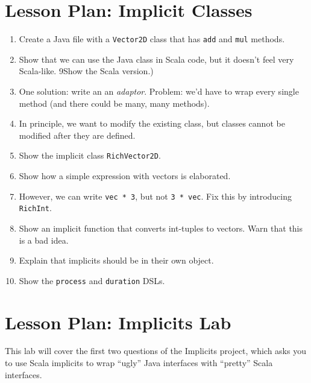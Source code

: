 \documentclass[9pt]{extbook}
\begin{document}
\chapter{Lesson Plan: Implicit Classes}

\begin{enumerate}

\item Create a Java file with  a \lstinline|Vector2D| class that has
  \lstinline|add| and \lstinline|mul| methods.

\item Show that we can use the Java class in Scala code, but it doesn't feel very
  Scala-like. 9Show the Scala version.)

\item One solution: write an an \emph{adaptor}. Problem: we'd have to wrap
  every single method (and there could be many, many methods).

\item In principle, we want to modify the existing class, but classes cannot
  be modified after they are defined.

\item Show the implicit class \lstinline|RichVector2D|.

\item Show how a simple expression with vectors is elaborated.

\item However, we can write \lstinline|vec * 3|, but not \lstinline|3 * vec|.
Fix this by introducing \lstinline|RichInt|.

\item Show an implicit function that converts int-tuples to vectors. Warn that 
  this is a bad idea.

\item Explain that implicits should be in their own object.

\item Show the \lstinline|process| and \lstinline|duration| DSLs.

\end{enumerate}

\chapter{Lesson Plan: Implicits Lab}

This lab will cover the first two questions of the Implicits project, 
which asks you to use Scala implicits to wrap ``ugly'' Java interfaces with ``pretty'' Scala interfaces.
\end{document}
